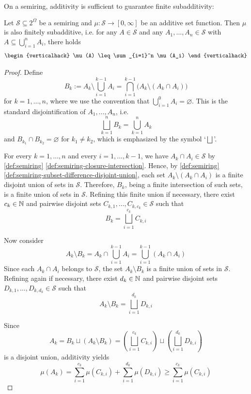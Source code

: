 On a semiring, additivity is sufficient to guarantee finite subadditivity:
\begin{lemma}\label{lem:on-semiring-additivity-implies-finite-subadditivity}
Let $\mathcal{S} \subseteq 2^\Omega$ be a semiring and $\mu : \mathcal{S} \to [0,\infty]$ be an additive set function.
Then $\mu$ is also finitely subadditive, i.e. for any $A \in \mathcal{S}$ and any $A_1, \ldots, A_n \in \mathcal{S}$ with
$A \subseteq \bigcup_{i=1}^n A_i$, 
there holds
\[
\begin{verticalhack}
\mu(A) \leq \sum_{i=1}^n \mu(A_i)
\end{verticalhack}
\qedhere
\]
\end{lemma}
\begin{proof}
Define
\[
B_k := A_k \setminus \bigcup_{i=1}^{k-1} A_i
=
\bigcap_{i=1}^{k-1}\bigl(A_k \setminus (A_k \cap A_i)\bigr)
\]
for $k = 1,\dots,n$,
where we use the convention that $\bigcup_{i=1}^0 A_i = \varnothing$.
This is the standard disjointification of $A_1,\dots,A_n$, i.e.
\[
\bigsqcup_{k=1}^n B_k = \bigcup_{k=1}^n A_k
\]
and $B_{k_1} \cap B_{k_2} = \varnothing$ for $k_1 \neq k_2$, which is emphasized by the symbol `$\bigsqcup$'.

For every \(k=1,\dots,n\) and every \(i=1,\dots,k-1\), we have
\(
A_k \cap A_i \in \mathcal{S}
\)
by \autoref{def:semiring} \ref{def:semiring-closure-intersection}.
Hence, by \autoref{def:semiring} \ref{def:semiring-subset-difference-disjoint-union}, each set
\(
A_k \setminus (A_k \cap A_i)
\)
is a finite disjoint union of sets in \(\mathcal{S}\).
Therefore, \(B_k\), being a finite intersection of such sets, is a finite union of sets in \(\mathcal{S}\).
Refining this finite union if necessary, there exist \(c_k \in \mathbb{N}\) and pairwise disjoint sets
\(
C_{k,1},\dots,C_{k,c_k} \in \mathcal{S}
\)
such that
\[
B_k = \bigsqcup_{i=1}^{c_k} C_{k,i}
\]

Now consider
\[
A_k \setminus B_k
=
A_k \cap \bigcup_{i=1}^{k-1} A_i
=
\bigcup_{i=1}^{k-1} (A_k \cap A_i)
\]
Since each \(A_k \cap A_i\) belongs to \(\mathcal{S}\), the set \(A_k \setminus B_k\) is a finite union of sets in \(\mathcal{S}\).
Refining again if necessary, there exist \(d_k \in \mathbb{N}\) and pairwise disjoint sets
\(
D_{k,1},\dots,D_{k,d_k} \in \mathcal{S}
\)
such that
\[
A_k \setminus B_k = \bigsqcup_{i=1}^{d_k} D_{k,i}
\]

Since
\[
A_k
=
B_k \sqcup (A_k \setminus B_k)
=
\left(\bigsqcup_{i=1}^{c_k} C_{k,i}\right)
\sqcup
\left(\bigsqcup_{i=1}^{d_k} D_{k,i}\right)
\]
is a disjoint union, additivity yields
\[
\mu(A_k)
=
\sum_{i=1}^{c_k} \mu(C_{k,i}) + \sum_{i=1}^{d_k} \mu(D_{k,i})
\geq
\sum_{i=1}^{c_k} \mu(C_{k,i})
\]


\end{proof}
